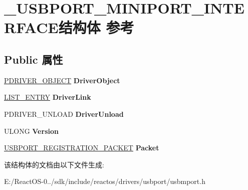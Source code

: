 \hypertarget{struct___u_s_b_p_o_r_t___m_i_n_i_p_o_r_t___i_n_t_e_r_f_a_c_e}{}\section{\+\_\+\+U\+S\+B\+P\+O\+R\+T\+\_\+\+M\+I\+N\+I\+P\+O\+R\+T\+\_\+\+I\+N\+T\+E\+R\+F\+A\+C\+E结构体 参考}
\label{struct___u_s_b_p_o_r_t___m_i_n_i_p_o_r_t___i_n_t_e_r_f_a_c_e}
\subsection*{Public 属性}
\begin{DoxyCompactItemize}
\item 
\mbox{\label{struct___u_s_b_p_o_r_t___m_i_n_i_p_o_r_t___i_n_t_e_r_f_a_c_e_a81a6475537fd1f3f1d3dca81d31e9ef8}} 
\hyperlink{struct___d_r_i_v_e_r___o_b_j_e_c_t}{P\+D\+R\+I\+V\+E\+R\+\_\+\+O\+B\+J\+E\+CT} {\bfseries Driver\+Object}
\item 
\mbox{\label{struct___u_s_b_p_o_r_t___m_i_n_i_p_o_r_t___i_n_t_e_r_f_a_c_e_a2005dce3593495cfd4d7c34331691b45}} 
\hyperlink{struct___l_i_s_t___e_n_t_r_y}{L\+I\+S\+T\+\_\+\+E\+N\+T\+RY} {\bfseries Driver\+Link}
\item 
\mbox{\label{struct___u_s_b_p_o_r_t___m_i_n_i_p_o_r_t___i_n_t_e_r_f_a_c_e_ae64bd7751b4463724effe44280452e76}} 
P\+D\+R\+I\+V\+E\+R\+\_\+\+U\+N\+L\+O\+AD {\bfseries Driver\+Unload}
\item 
\mbox{\label{struct___u_s_b_p_o_r_t___m_i_n_i_p_o_r_t___i_n_t_e_r_f_a_c_e_ab73f19c50931b794b8e0b59db84af62f}} 
U\+L\+O\+NG {\bfseries Version}
\item 
\mbox{\label{struct___u_s_b_p_o_r_t___m_i_n_i_p_o_r_t___i_n_t_e_r_f_a_c_e_a03b7244f19bd76ea2f3e576b954e47b9}} 
\hyperlink{struct___u_s_b_p_o_r_t___r_e_g_i_s_t_r_a_t_i_o_n___p_a_c_k_e_t}{U\+S\+B\+P\+O\+R\+T\+\_\+\+R\+E\+G\+I\+S\+T\+R\+A\+T\+I\+O\+N\+\_\+\+P\+A\+C\+K\+ET} {\bfseries Packet}
\end{DoxyCompactItemize}


该结构体的文档由以下文件生成\+:\begin{DoxyCompactItemize}
\item 
E\+:/\+React\+O\+S-\/0../sdk/include/reactos/drivers/usbport/usbmport.\+h\end{DoxyCompactItemize}
